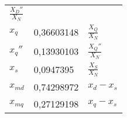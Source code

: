 \begin{longtable}[]{@{}lll@{}}
\begin{minipage}[t]{0.69\columnwidth}
\(\frac{X_D''}{X_N}\)\strut
\end{minipage}\tabularnewline
\begin{minipage}[t]{0.13\columnwidth}\raggedright
\(x_q\)\strut
\end{minipage} & \begin{minipage}[t]{0.09\columnwidth}\raggedright
0,36603148\strut
\end{minipage} & \begin{minipage}[t]{0.69\columnwidth}\raggedright
\(\frac{X_Q}{X_N}\)\strut
\end{minipage}\tabularnewline
\begin{minipage}[t]{0.13\columnwidth}\raggedright
\(x_q''\)\strut
\end{minipage} & \begin{minipage}[t]{0.09\columnwidth}\raggedright
0,13930103\strut
\end{minipage} & \begin{minipage}[t]{0.69\columnwidth}\raggedright
\(\frac{X_Q''}{X_N}\)\strut
\end{minipage}\tabularnewline
\begin{minipage}[t]{0.13\columnwidth}\raggedright
\(x_s\)\strut
\end{minipage} & \begin{minipage}[t]{0.09\columnwidth}\raggedright
0,0947395\strut
\end{minipage} & \begin{minipage}[t]{0.69\columnwidth}\raggedright
\(\frac{X_S}{X_N}\)\strut
\end{minipage}\tabularnewline
\begin{minipage}[t]{0.13\columnwidth}\raggedright
\(x_{md}\)\strut
\end{minipage} & \begin{minipage}[t]{0.09\columnwidth}\raggedright
0,74298972\strut
\end{minipage} & \begin{minipage}[t]{0.69\columnwidth}\raggedright
\(x_d-x_s\)\strut
\end{minipage}\tabularnewline
\begin{minipage}[t]{0.13\columnwidth}\raggedright
\(x_{mq}\)\strut
\end{minipage} & \begin{minipage}[t]{0.09\columnwidth}\raggedright
0,27129198\strut
\end{minipage} & \begin{minipage}[t]{0.69\columnwidth}\raggedright
\(x_q-x_s\)\strut
\end{minipage}\tabularnewline

\end{longtable}
